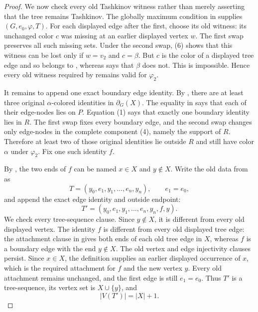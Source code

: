 \begin{proof}
We now check every old Tashkinov witness rather than merely asserting
that the tree remains Tashkinov.  The globally maximum condition in
 supplies
$(G,e_0,\varphi,T)$.  For each displayed edge after
the first, choose its old witness: its unchanged color $c$ was missing at
an earlier displayed vertex $w$.  The first swap preserves all such
missing sets.  Under the second swap, (6) shows that this witness can be
lost only if $w=v_2$ and $c=\beta$.  But $c$ is the color of a displayed
tree edge and so belongs to , whereas
 says that $\beta$ does not.  This is
impossible.  Hence every old witness required by
 remains valid for $\varphi_2$.

It remains to append one exact boundary edge identity.  By
, there are at least three
original $\alpha$-colored identities in $\partial_G(X)$.  The equality in
 says that each of their
edge-nodes lies on $P$.  Equation (1) says that exactly one boundary
identity lies in $R$.  The first swap fixes every boundary edge, and the
second swap changes only edge-nodes in the complete component (4), namely
the support of $R$.  Therefore at least two of those original identities
lie outside $R$ and still have color $\alpha$ under $\varphi_2$.  Fix one
such identity $f$.

By , the two ends of $f$ can be named $x\in X$
and $y\notin X$.  Write the old data from  as
\[
 T=(y_0,e_1,y_1,\ldots,e_n,y_n),\qquad e_1=e_0,
\]
and append the exact edge identity and outside endpoint:
\[
 T'=(y_0,e_1,y_1,\ldots,e_n,y_n,f,y).
\]
We check every tree-sequence clause.  Since $y\notin X$, it is different
from every old displayed vertex.  The identity $f$ is different from
every old displayed tree edge: the attachment clause in
 gives both ends of each old tree edge in $X$,
whereas $f$ is a boundary edge with the end $y\notin X$.  The old vertex
and edge injectivity clauses persist.  Since $x\in X$, the definition
 supplies an earlier displayed occurrence
of $x$, which is the required attachment for $f$ and the new vertex $y$.
Every old attachment remains unchanged, and the first edge is still
$e_1=e_0$.  Thus $T'$ is a tree-sequence, its vertex set is
$X\cup\{y\}$, and
\[
 |V(T')|=|X|+1.                                                  \tag{7}
\]


\end{proof}
